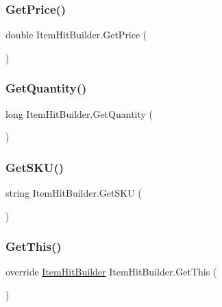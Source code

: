 \subsubsection{\texorpdfstring{Get\+Price()}{GetPrice()}}
{\footnotesize\ttfamily double Item\+Hit\+Builder.\+Get\+Price (\begin{DoxyParamCaption}{ }\end{DoxyParamCaption})}

\mbox{\label{class_item_hit_builder_a980087be9ca9c9ecd215ab5072527d92}} 
\subsubsection{\texorpdfstring{Get\+Quantity()}{GetQuantity()}}
{\footnotesize\ttfamily long Item\+Hit\+Builder.\+Get\+Quantity (\begin{DoxyParamCaption}{ }\end{DoxyParamCaption})}

\mbox{\label{class_item_hit_builder_ab8c7b6d0a36421f1a118ad20d728d771}} 
\subsubsection{\texorpdfstring{Get\+S\+K\+U()}{GetSKU()}}
{\footnotesize\ttfamily string Item\+Hit\+Builder.\+Get\+S\+KU (\begin{DoxyParamCaption}{ }\end{DoxyParamCaption})}

\mbox{\label{class_item_hit_builder_a1e4bf966bf09e948db5d5eef3f56358f}} 
\subsubsection{\texorpdfstring{Get\+This()}{GetThis()}}
{\footnotesize\ttfamily override \hyperlink{class_item_hit_builder}{Item\+Hit\+Builder} Item\+Hit\+Builder.\+Get\+This (\begin{DoxyParamCaption}{ }\end{DoxyParamCaption})\hspace{0.3cm}{\ttfamily [virtual]}}



